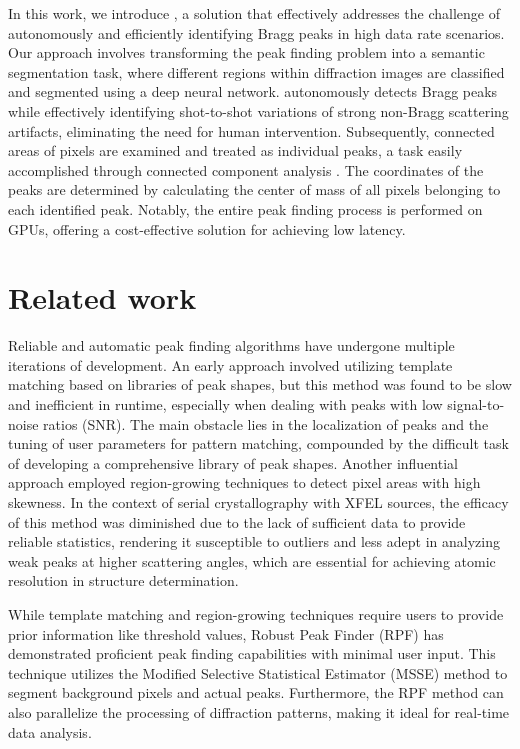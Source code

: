 \documentclass[a4paper]{article}
\begin{document}
In this work, we introduce \peaknet{}, a solution that effectively addresses the challenge of autonomously and efficiently identifying Bragg peaks in high data rate scenarios.  Our approach involves transforming the peak finding problem into a semantic segmentation task, where different regions within diffraction images are classified and segmented using a deep neural network. \peaknet{} autonomously detects Bragg peaks while effectively identifying shot-to-shot variations of strong non-Bragg scattering artifacts, eliminating the need for human intervention.  Subsequently, connected areas of pixels are examined and treated as individual peaks, a task easily accomplished through connected component analysis \citep{weaverCentrosymmetricCrossSymmetricMatrices1985}.  The coordinates of the peaks are determined by calculating the center of mass of all pixels belonging to each identified peak.  Notably, the entire peak finding process is performed on GPUs, offering a cost-effective solution for achieving low latency.


\section{Related work}

Reliable and automatic peak finding algorithms have undergone multiple iterations of development.  An early approach involved utilizing template matching \citep{wilkinsonIntegrationSinglecrystalReflections1988a} based on libraries of peak shapes, but this method was found to be slow and inefficient in runtime, especially when dealing with peaks with low signal-to-noise ratios (SNR).  The main obstacle lies in the localization of peaks and the tuning of user parameters for pattern matching, compounded by the difficult task of developing a comprehensive library of peak shapes.  Another influential approach employed region-growing techniques \citep{bolotovskySeedSkewnessMethodIntegration1995, bartyCheetahSoftwareHighthroughput2014} to detect pixel areas with high skewness.  In the context of serial crystallography with XFEL sources, the efficacy of this method was diminished due to the lack of sufficient data to provide reliable statistics, rendering it susceptible to outliers and less adept in analyzing weak peaks at higher scattering angles, which are essential for achieving atomic resolution in structure determination.

While template matching and region-growing techniques require users to provide prior information like threshold values, Robust Peak Finder (RPF) \citep{hadian-jaziPeakfindingAlgorithmBased2017, hadian-jaziDataReductionSerial2021} has demonstrated proficient peak finding capabilities with minimal user input.  This technique utilizes the Modified Selective Statistical Estimator (MSSE) method to segment background pixels and actual peaks.  Furthermore, the RPF method can also parallelize the processing of diffraction patterns, making it ideal for real-time data analysis.
\end{document}
